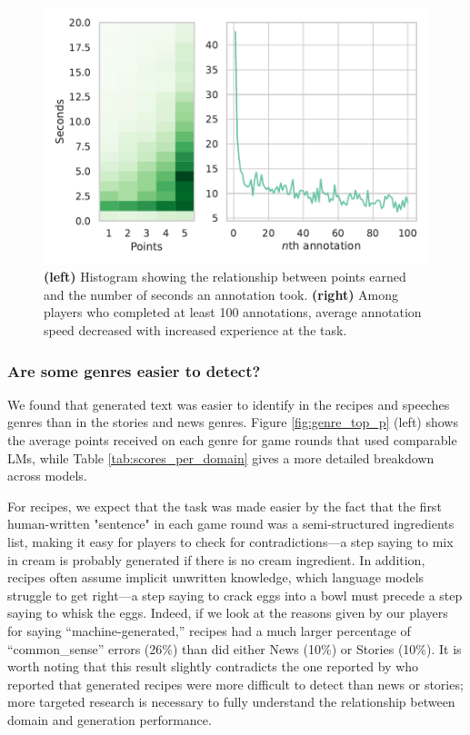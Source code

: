 \begin{figure}[tb]
    \centering
    \includegraphics[width=\linewidth]{figures/time_tracking.pdf}
    \caption{\textbf{(left)} Histogram showing the relationship between points earned and the number of seconds an annotation took. \textbf{(right)} Among players who completed at least 100 annotations, average annotation speed decreased with increased experience at the task.
    }
    \label{fig:time_tracking}
\end{figure}


\subsubsection{Are some genres easier to detect?}
We found that generated text was easier to identify in the recipes and speeches genres than in the stories and news genres.
Figure \ref{fig:genre_top_p} (left) shows the average points received on each genre for game rounds that used comparable LMs, while Table \ref{tab:scores_per_domain} gives a more detailed breakdown across models. 

For recipes, we expect that the task was made easier by the fact that the first human-written "sentence" in each game round was a semi-structured ingredients list, making it easy for players to check for contradictions---a step saying to mix in cream is probably generated if there is no cream ingredient.
In addition, recipes often assume implicit unwritten knowledge, which language models struggle to get right---a step saying to crack eggs into a bowl must precede a step saying to  whisk the eggs.
Indeed, if we look at the reasons given by our players for saying ``machine-generated,'' recipes had a much larger percentage of ``common\_sense'' errors (26\%) than did either News (10\%) or Stories (10\%).
It is worth noting that this result slightly contradicts the one reported by \citet{clark2021all} who reported that generated recipes were more difficult to detect than news or stories; more targeted research is necessary to fully understand the relationship between domain and generation performance.

